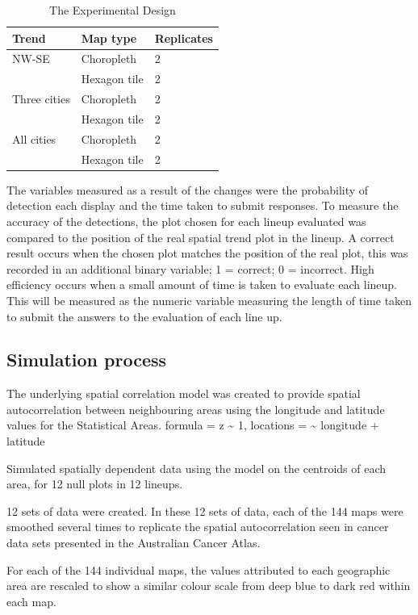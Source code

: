 \documentclass[conference,final,]{IEEEtran}
\begin{document}
\begin{table}[]
\caption{The Experimental Design}
\label{tab:my-table}
\begin{tabular}{|l|l|l|}
\hline
Trend & Map type & Replicates \\ \hline
NW-SE & Choropleth & 2 \\ \hline
 & Hexagon tile & 2 \\ \hline
Three cities & Choropleth & 2 \\ \hline
 & Hexagon tile & 2 \\ \hline
All cities & Choropleth & 2 \\ \hline
 & Hexagon tile & 2 \\ \hline
\end{tabular}
\end{table}

The variables measured as a result of the changes were the probability
of detection each display and the time taken to submit responses. To
measure the accuracy of the detections, the plot chosen for each lineup
evaluated was compared to the position of the real spatial trend plot in
the lineup. A correct result occurs when the chosen plot matches the
position of the real plot, this was recorded in an additional binary
variable; 1 = correct; 0 = incorrect. High efficiency occurs when a
small amount of time is taken to evaluate each lineup. This will be
measured as the numeric variable measuring the length of time taken to
submit the answers to the evaluation of each line up.

\hypertarget{simulation-process}{%
\subsection{Simulation process}\label{simulation-process}}

The underlying spatial correlation model was created to provide spatial
autocorrelation between neighbouring areas using the longitude and
latitude values for the Statistical Areas. formula = z \textasciitilde{}
1, locations = \textasciitilde{} longitude + latitude

Simulated spatially dependent data using the model on the centroids of
each area, for 12 null plots in 12 lineups.

12 sets of data were created. In these 12 sets of data, each of the 144
maps were smoothed several times to replicate the spatial
autocorrelation seen in cancer data sets presented in the Australian
Cancer Atlas.

For each of the 144 individual maps, the values attributed to each
geographic area are rescaled to show a similar colour scale from deep
blue to dark red within each map.
\end{document}
